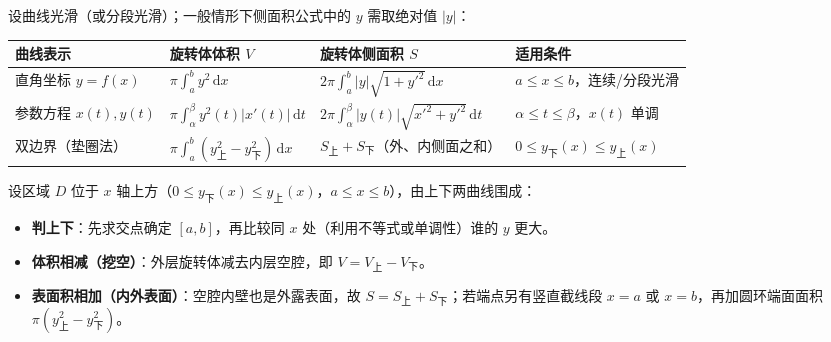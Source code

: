 \documentclass[11pt,a4paper]{ctexart}
\begin{document}

设曲线光滑（或分段光滑）；一般情形下侧面积公式中的 $y$ 需取绝对值 $\lvert y\rvert$：

\begin{center}\small
\begin{tabularx}{\linewidth}{@{}>{\raggedright\arraybackslash}X>{\raggedright\arraybackslash}X>{\raggedright\arraybackslash}X>{\raggedright\arraybackslash}X@{}}
\toprule
曲线表示 & 旋转体体积 $V$ & 旋转体侧面积 $S$ & 适用条件 \\
\midrule
直角坐标 $y=f(x)$ & $\pi\int_a^b y^{2}\,\mathrm{d}x$ & $2\pi\int_a^b \lvert y\rvert\sqrt{1+y'^{2}}\,\mathrm{d}x$ & $a\le x\le b$，连续/分段光滑 \\
参数方程 $x(t),y(t)$ & $\pi\int_\alpha^\beta y^{2}(t)\lvert x'(t)\rvert\,\mathrm{d}t$ & $2\pi\int_\alpha^\beta \lvert y(t)\rvert\sqrt{x'^{2}+y'^{2}}\,\mathrm{d}t$ & $\alpha\le t\le\beta$，$x(t)$ 单调 \\
双边界（垫圈法） & $\pi\int_a^b (y_{\text{上}}^{2}-y_{\text{下}}^{2})\,\mathrm{d}x$ & $S_{\text{上}}+S_{\text{下}}$（外、内侧面之和） & $0\le y_{\text{下}}(x)\le y_{\text{上}}(x)$ \\
\bottomrule
\end{tabularx}
\end{center}



设区域 $D$ 位于 $x$ 轴上方（$0\le y_{\text{下}}(x)\le y_{\text{上}}(x)$，$a\le x\le b$），由上下两曲线围成：

\begin{itemize}

\item \textbf{判上下}：先求交点确定 $[a,b]$，再比较同 $x$ 处（利用不等式或单调性）谁的 $y$ 更大。

\item \textbf{体积相减（挖空）}：外层旋转体减去内层空腔，即 $V = V_{\text{上}} - V_{\text{下}}$。

\item \textbf{表面积相加（内外表面）}：空腔内壁也是外露表面，故 $S = S_{\text{上}} + S_{\text{下}}$；若端点另有竖直截线段 $x=a$ 或 $x=b$，再加圆环端面面积 $\pi(y_{\text{上}}^2 - y_{\text{下}}^2)$。

\end{itemize}
\end{document}

